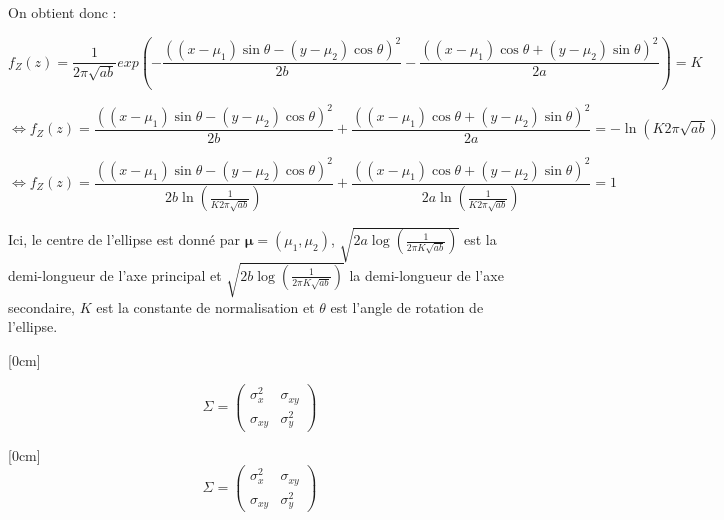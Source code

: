 \documentclass{article}
\begin{document}
On obtient donc :

$$ f_Z(z) = \frac{1}{2\pi \sqrt{ab}}exp(-\frac{((x-\mu_1)\sin\theta-(y-\mu_2)\cos\theta)^{2}}{2b}-\frac{((x-\mu_1)\cos\theta+(y-\mu_2)\sin\theta)^{2}}{2a})=K$$

$$\Leftrightarrow  f_Z(z) = \frac{((x-\mu_1)\sin\theta-(y-\mu_2)\cos\theta)^{2}}{2b}+\frac{((x-\mu_1)\cos\theta+(y-\mu_2)\sin\theta)^{2}}{2a}=-\ln(K2\pi\sqrt{ab})$$

$$\Leftrightarrow  f_Z(z) = \frac{((x-\mu_1)\sin\theta-(y-\mu_2)\cos\theta)^{2}}{2b\ln(\frac{1}{K2\pi\sqrt{ab}})}+\frac{((x-\mu_1)\cos\theta+(y-\mu_2)\sin\theta)^{2}}{2a\ln(\frac{1}{K2\pi\sqrt{ab}})}=1$$

Ici, le centre de l'ellipse est donné par $\mathbf{\mu} = (\mu_1, \mu_2)$, $\sqrt{2a \log(\frac{1}{2\pi K \sqrt{ab}})}$ est la demi-longueur de l'axe principal et $\sqrt{2b \log(\frac{1}{2\pi K \sqrt{ab}})}$ la demi-longueur de l'axe secondaire, $K$ est la constante de normalisation et $\theta$ est l'angle de rotation de l'ellipse.

\reversemarginpar{}[0cm]

\[
\Sigma = \begin{pmatrix}
    \sigma_{x}^2 & \sigma_{xy} \\
    \sigma_{xy} & \sigma_{y}^2 
\end{pmatrix}
\]

\reversemarginpar{}[0cm]
\[
\Sigma = \begin{pmatrix}
    \sigma_{x}^2 & \sigma_{xy} \\
    \sigma_{xy} & \sigma_{y}^2 
\end{pmatrix}
\]
\end{document}
